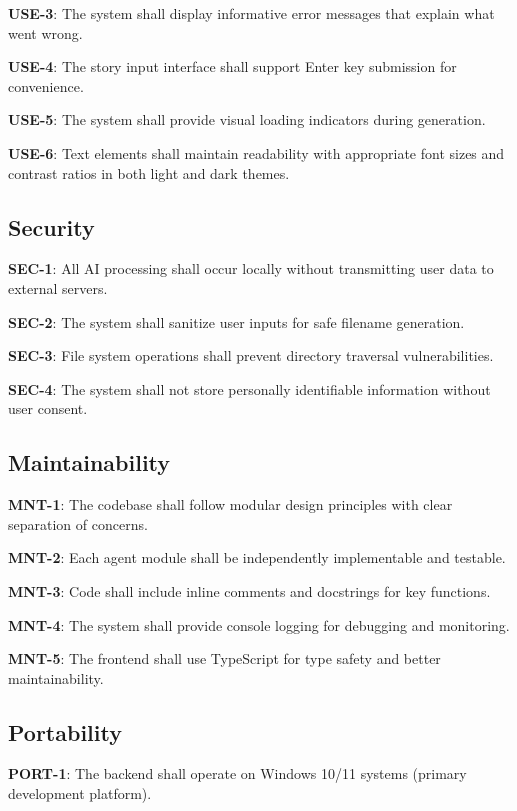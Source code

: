 \textbf{USE-3}: The system shall display informative error messages that explain what went wrong.

\textbf{USE-4}: The story input interface shall support Enter key submission for convenience.

\textbf{USE-5}: The system shall provide visual loading indicators during generation.

\textbf{USE-6}: Text elements shall maintain readability with appropriate font sizes and contrast ratios in both light and dark themes.

\subsection{Security}

\textbf{SEC-1}: All AI processing shall occur locally without transmitting user data to external servers.

\textbf{SEC-2}: The system shall sanitize user inputs for safe filename generation.

\textbf{SEC-3}: File system operations shall prevent directory traversal vulnerabilities.

\textbf{SEC-4}: The system shall not store personally identifiable information without user consent.

\subsection{Maintainability}

\textbf{MNT-1}: The codebase shall follow modular design principles with clear separation of concerns.

\textbf{MNT-2}: Each agent module shall be independently implementable and testable.

\textbf{MNT-3}: Code shall include inline comments and docstrings for key functions.

\textbf{MNT-4}: The system shall provide console logging for debugging and monitoring.

\textbf{MNT-5}: The frontend shall use TypeScript for type safety and better maintainability.

\subsection{Portability}

\textbf{PORT-1}: The backend shall operate on Windows 10/11 systems (primary development platform).

